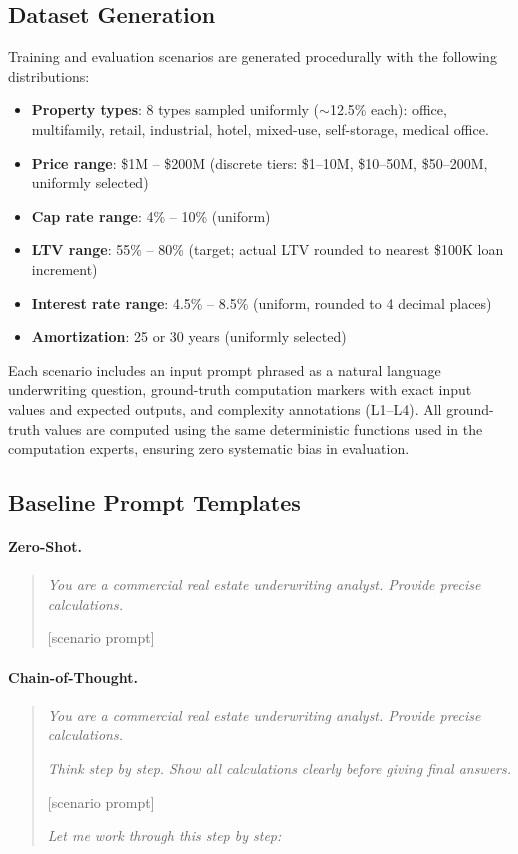 \subsection{Dataset Generation}
\label{sec:appendix:data}

Training and evaluation scenarios are generated procedurally with the
following distributions:
\begin{itemize}
\item \textbf{Property types}: 8 types sampled uniformly
(${\sim}$12.5\% each): office, multifamily, retail, industrial,
hotel, mixed-use, self-storage, medical office.
\item \textbf{Price range}: \$1M -- \$200M (discrete tiers: \$1--10M,
\$10--50M, \$50--200M, uniformly selected)
\item \textbf{Cap rate range}: 4\% -- 10\% (uniform)
\item \textbf{LTV range}: 55\% -- 80\% (target; actual LTV rounded to
nearest \$100K loan increment)
\item \textbf{Interest rate range}: 4.5\% -- 8.5\% (uniform, rounded to
4 decimal places)
\item \textbf{Amortization}: 25 or 30 years (uniformly selected)
\end{itemize}

Each scenario includes an input prompt phrased as a natural language
underwriting question, ground-truth computation markers with exact
input values and expected outputs, and complexity annotations (L1--L4).
All ground-truth values are computed using the same deterministic
functions used in the computation experts, ensuring zero systematic
bias in evaluation.

\subsection{Baseline Prompt Templates}
\label{sec:appendix:prompts}

\paragraph{Zero-Shot.}
\begin{quote}
\small
\textit{You are a commercial real estate underwriting analyst. Provide
precise calculations.}

[scenario prompt]
\end{quote}

\paragraph{Chain-of-Thought.}
\begin{quote}
\small
\textit{You are a commercial real estate underwriting analyst. Provide
precise calculations.}

\textit{Think step by step. Show all calculations clearly before giving
final answers.}

[scenario prompt]

\textit{Let me work through this step by step:}
\end{quote}

